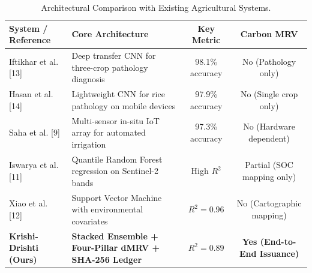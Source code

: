 \documentclass[10pt,a4paper,twocolumn]{IEEEtran}
\begin{document}
\begin{table}[!t]
  \centering
  \caption{Architectural Comparison with Existing Agricultural Systems.}
  \label{tab:comp}
  \setlength{\tabcolsep}{6pt}
  \begin{tabularx}{\textwidth}{l X c c}
    \toprule
    \textbf{System / Reference} & \textbf{Core Architecture} & \textbf{Key Metric} & \textbf{Carbon MRV} \\
    \midrule
    Iftikhar et al. [13] & Deep transfer CNN for three-crop pathology diagnosis & 98.1\% accuracy & No (Pathology only) \\
    Hasan et al. [14]    & Lightweight CNN for rice pathology on mobile devices & 97.9\% accuracy & No (Single crop only) \\
    Saha et al. [9]      & Multi-sensor in-situ IoT array for automated irrigation & 97.3\% accuracy & No (Hardware dependent) \\
    Iswarya et al. [11]  & Quantile Random Forest regression on Sentinel-2 bands & High $R^2$ & Partial (SOC mapping only) \\
    Xiao et al. [12]     & Support Vector Machine with environmental covariates & $R^2 = 0.96$ & No (Cartographic mapping) \\
    \midrule
    \textbf{Krishi-Drishti (Ours)} & \textbf{Stacked Ensemble + Four-Pillar dMRV + SHA-256 Ledger} & \textbf{$R^2 = 0.89$} & \textbf{Yes (End-to-End Issuance)} \\
    \bottomrule
  \end{tabularx}
\end{table}
\end{document}
